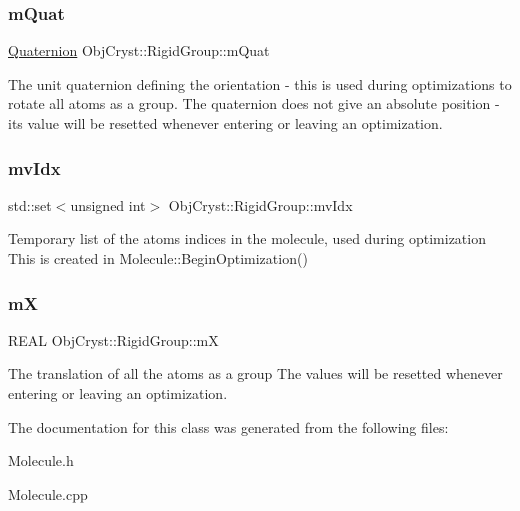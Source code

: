 \subsubsection{\texorpdfstring{mQuat}{mQuat}}
{\footnotesize\ttfamily \mbox{\hyperlink{class_obj_cryst_1_1_quaternion}{Quaternion}} Obj\+Cryst\+::\+Rigid\+Group\+::m\+Quat\hspace{0.3cm}{\ttfamily [mutable]}}

The unit quaternion defining the orientation -\/ this is used during optimizations to rotate all atoms as a group. The quaternion does not give an absolute position -\/ its value will be resetted whenever entering or leaving an optimization. \mbox{\label{class_obj_cryst_1_1_rigid_group_a5c24037c1724aa2e0060c9432f0ec907}} 
\subsubsection{\texorpdfstring{mvIdx}{mvIdx}}
{\footnotesize\ttfamily std\+::set$<$unsigned int$>$ Obj\+Cryst\+::\+Rigid\+Group\+::mv\+Idx\hspace{0.3cm}{\ttfamily [mutable]}}

Temporary list of the atoms indices in the molecule, used during optimization This is created in Molecule\+::\+Begin\+Optimization() \mbox{\label{class_obj_cryst_1_1_rigid_group_abda5125459a21cc5534c90d9516312e9}} 
\subsubsection{\texorpdfstring{mX}{mX}}
{\footnotesize\ttfamily R\+E\+AL Obj\+Cryst\+::\+Rigid\+Group\+::mX\hspace{0.3cm}{\ttfamily [mutable]}}

The translation of all the atoms as a group The values will be resetted whenever entering or leaving an optimization. 

The documentation for this class was generated from the following files\+:\begin{DoxyCompactItemize}
\item 
Molecule.\+h\item 
Molecule.\+cpp\end{DoxyCompactItemize}
